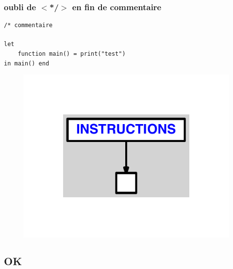 \documentclass{article}
\begin{document}
\subsubsection{oubli de $ < $*/$ > $ en fin de commentaire}
\begin{lstlisting}
/* commentaire

let
	function main() = print("test")
in main() end
\end{lstlisting}
\newpage
\begin{figure}[H]
\centering
\includegraphics[max width=\textwidth]{ast/ast_149.pdf}
\end{figure}
\newpage
\subsection{OK}
\end{document}
